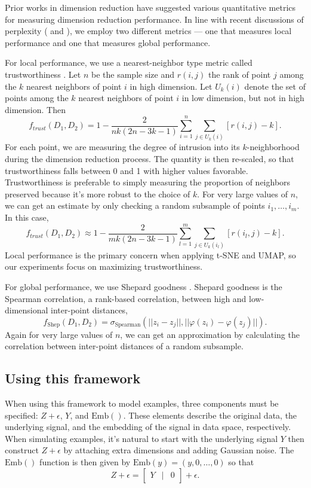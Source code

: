 \documentclass{article}
\begin{document}
Prior works in dimension reduction have suggested various quantitative metrics for measuring dimension reduction performance. In line with recent discussions of perplexity (\cite{t-SNE cell} and \cite{large DR unreliable}), we employ two different metrics --- one that measures local performance and one that measures global performance.

For local performance, we use a nearest-neighbor type metric called trustworthiness \cite{trustworthiness}. Let $n$ be the sample size and $r(i,j)$ the rank of point $j$ among the $k$ nearest neighbors of point $i$ in high dimension. Let $U_k(i)$ denote the set of points among the $k$ nearest neighbors of point $i$ in low dimension, but not in high dimension. Then $$f_{trust}(D_1, D_2) = 1 - \frac{2}{nk(2n - 3k - 1)}\sum_{i=1}^n \sum_{j \in U_k(i)} \left[ r(i,j) - k \right].$$ For each point, we are measuring the degree of intrusion into its $k$-neighborhood during the dimension reduction process. The quantity is then re-scaled, so that trustworthiness falls between 0 and 1 with higher values favorable. Trustworthiness is preferable to simply measuring the proportion of neighbors preserved because it's more robust to the choice of $k$. For very large values of $n$, we can get an estimate by only checking a random subsample of points $i_1, \hdots, i_m$. In this case, $$f_{trust}(D_1, D_2) \approx 1 - \frac{2}{mk(2n - 3k - 1)}\sum_{l=1}^m \sum_{j \in U_k(i_l)} \left[ r(i_l,j) - k \right].$$ Local performance is the primary concern when applying t-SNE and UMAP, so our experiments focus on maximizing trustworthiness.

For global performance, we use Shepard goodness \cite{quantitative survey}. Shepard goodness is the Spearman correlation, a rank-based correlation, between high and low-dimensional inter-point distances,$$f_\textrm{Shep}(D_1, D_2) = \sigma_\textrm{Spearman}(||z_i - z_j||, ||\varphi(z_i) - \varphi(z_j)||).$$ Again for very large values of $n$, we can get an approximation by calculating the correlation between inter-point distances of a random subsample.

\subsection{Using this framework}
When using this framework to model examples, three components must be specified: $Z + \epsilon$, $Y$, and $\textrm{Emb}()$. These elements describe the original data, the underlying signal, and the embedding of the signal in data space, respectively. When simulating examples, it's natural to start with the underlying signal $Y$ then construct $Z + \epsilon$ by attaching extra dimensions and adding Gaussian noise. The $\textrm{Emb}()$ function is then given by $\textrm{Emb}(y) = (y,0,\hdots,0)$ so that
$$Z + \epsilon = \begin{bmatrix}
Y & \vert & 0
\end{bmatrix} + \epsilon.$$
\end{document}
